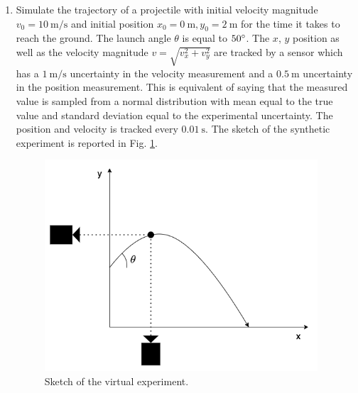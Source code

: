 \documentclass[11pt]{article}
\begin{document}
\begin{enumerate}[start=1,label={\bfseries Task \arabic*:}]
\item Simulate the trajectory of a projectile with initial velocity magnitude $v_0 = 10 \  \mathrm{m/ s}$ and initial position $x_0 = 0 \ \mathrm{m}, y_0 = 2 \ \mathrm{m}$ for the time it takes to reach the ground. The launch angle $\theta$ is equal to $50 \degree $. The $x$, $y$ position as well as the velocity magnitude $v = \sqrt{v_x^2 + v_y^2} $ are tracked by a sensor which has a $1 \ \mathrm{m/s}$ uncertainty in the velocity measurement and a $0.5 \ \mathrm{m}$ uncertainty in the position measurement. This is equivalent of saying that the measured value is sampled from a normal distribution with mean equal to the true value and standard deviation equal to the experimental uncertainty. The position and velocity is tracked every $0.01 \ \mathrm{s}$.
The sketch of the synthetic experiment is reported  in Fig. \ref{fig_bullet_experiment}.\par

\begin{figure}[h]
\centering
\includegraphics[width=4in]{Images/Bullet_experiment.png}
\caption{Sketch of the virtual experiment.}
\label{fig_bullet_experiment} 
\end{figure}


\end{enumerate}
\end{document}
